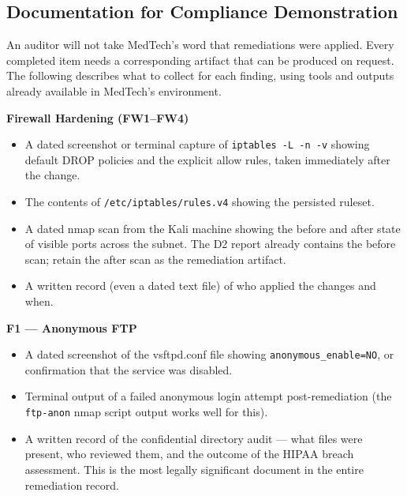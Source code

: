\documentclass[12pt]{article}
\begin{document}
\subsection{Documentation for Compliance Demonstration}
 
An auditor will not take MedTech's word that remediations were applied.
Every completed item needs a corresponding artifact that can be produced on
request. The following describes what to collect for each finding, using
tools and outputs already available in MedTech's environment.
 
\bigskip
 
\noindent\textbf{Firewall Hardening (FW1--FW4)}
 
\begin{itemize}[leftmargin=1.5em, itemsep=4pt]
  \item A dated screenshot or terminal capture of
    \texttt{iptables -L -n -v} showing default DROP policies and the
    explicit allow rules, taken immediately after the change.
  \item The contents of \texttt{/etc/iptables/rules.v4} showing the
    persisted ruleset.
  \item A dated nmap scan from the Kali machine showing the before and
    after state of visible ports across the subnet. The D2 report already
    contains the before scan; retain the after scan as the remediation
    artifact.
  \item A written record (even a dated text file) of who applied the
    changes and when.
\end{itemize}
 
\bigskip
 
\noindent\textbf{F1 --- Anonymous FTP}
 
\begin{itemize}[leftmargin=1.5em, itemsep=4pt]
  \item A dated screenshot of the vsftpd.conf file showing
    \texttt{anonymous\_enable=NO}, or confirmation that the service was
    disabled.
  \item Terminal output of a failed anonymous login attempt post-remediation
    (the \texttt{ftp-anon} nmap script output works well for this).
  \item A written record of the confidential directory audit --- what files
    were present, who reviewed them, and the outcome of the HIPAA breach
    assessment. This is the most legally significant document in the entire
    remediation record.
\end{itemize}
 
\end{document}

